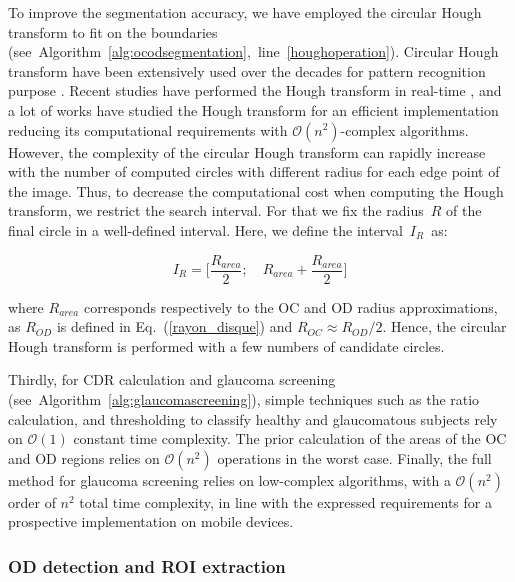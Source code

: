 To improve the segmentation accuracy, we have employed the circular Hough transform to fit on the boundaries \mbox{(see Algorithm~\ref{alg:ocodsegmentation}, line \ref{houghoperation})}. Circular Hough transform have been extensively used over the decades for pattern recognition purpose \citep{mukhopadhyay}. Recent studies have performed the Hough transform in real-time \citep{weiss}, and a lot of works have studied the Hough transform for an efficient implementation reducing its computational requirements \citep{houghsurvey, soltany2011fast} with $\mathcal{O}(n^2)$-complex algorithms. However, the complexity of the circular Hough transform can rapidly increase with the number of computed circles with different radius for each edge point of the image. Thus, to decrease the computational cost when computing the Hough transform, we restrict the search interval. For that we fix the \mbox{radius $R$} of the final circle in a well-defined interval. Here, we define the \mbox{interval $I_R$ as:}

\begin{equation}
I_R = \Bigg[\frac{R_{area}}{2}; \quad R_{area} + \frac{R_{area}}{2} \Bigg]
\end{equation}

\noindent where $R_{area}$ corresponds respectively to the OC and OD radius approximations, as $R_{OD}$ is defined in \mbox{Eq. (\ref{rayon_disque})} and \mbox{$R_{OC} \approx R_{OD}/2$}. Hence, the circular Hough transform is performed with a few numbers of candidate circles.

Thirdly, for CDR calculation and glaucoma screening \mbox{(see Algorithm~\ref{alg:glaucomascreening})}, simple techniques such as the ratio calculation, and thresholding to classify healthy and glaucomatous subjects rely on $\mathcal{O}(1)$ constant time complexity. The prior calculation of the areas of the OC and OD regions relies on $\mathcal{O}(n^2)$ operations in the worst case.
Finally, the full method for glaucoma screening relies on low-complex algorithms, with a $\mathcal{O}(n^2)$ order of $n^2$ total time complexity, in line with the expressed requirements for a prospective implementation on mobile devices.

\vspace{0.2cm}



\subsubsection{OD detection and ROI extraction}

